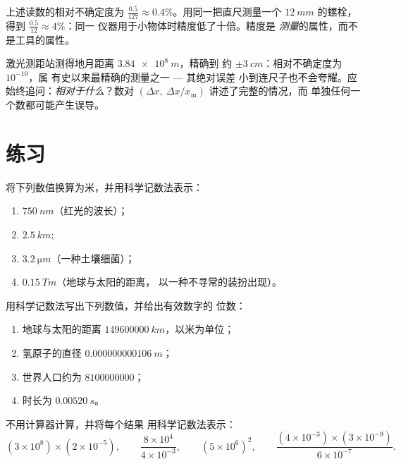 \begin{example}[相对精度]\label{ex:g10:orders-of-magnitude:reading}
上述读数的相对不确定度为
$\frac{0.5}{127} \approx 0.4\%$。用同一把直尺测量一个
$\qty{12}{mm}$ 的螺栓，得到 $\frac{0.5}{12} \approx 4\%$：同一
仪器用于小物体时精度低了十倍。精度是
\emph{测量}的属性，而不是工具的属性。
\end{example}

\begin{remark}\label{rem:g10:orders-of-magnitude:precision}
激光测距站测得地月距离 $\qty{3.84e8}{m}$，精确到
约 $\pm\qty{3}{cm}$：相对不确定度为 $10^{-10}$，属
有史以来最精确的测量之一 --- 其绝对误差
小到连尺子也不会夸耀。应始终追问：\emph{相对于什么}？数对
$(\Delta x,\ \Delta x / x_{\text{m}})$ 讲述了完整的情况，而
单独任何一个数都可能产生误导。
\end{remark}

\section{练习}

\begin{exercise}[$\star$]\label{exo:g10:orders-of-magnitude:1}
将下列数值换算为米，并用科学记数法表示：
\begin{enumerate}
  \item $\qty{750}{nm}$（红光的波长）；
  \item $\qty{2.5}{km}$;
  \item $\qty{3.2}{\micro m}$（一种土壤细菌）；
  \item $\qty{0.15}{Tm}$（地球与太阳的距离，
        以一种不寻常的装扮出现）。
\end{enumerate}
\end{exercise}

\begin{exercise}[$\star$]\label{exo:g10:orders-of-magnitude:2}
用科学记数法写出下列数值，并给出有效数字的
位数：
\begin{enumerate}
  \item 地球与太阳的距离 $\qty{149600000}{km}$，以米为单位；
  \item 氢原子的直径 $\qty{0.000000000106}{m}$；
  \item 世界人口约为 $\num{8100000000}$；
  \item 时长为 $\qty{0.00520}{s}$。
\end{enumerate}
\end{exercise}

\begin{exercise}[$\star$]\label{exo:g10:orders-of-magnitude:3}
不用计算器计算，并将每个结果
用科学记数法表示：
\[
(3\times10^{8})\times(2\times10^{-5}), \qquad
\frac{8\times10^{4}}{4\times10^{-3}}, \qquad
(5\times10^{6})^{2}, \qquad
\frac{(4\times10^{-3})\times(3\times10^{-9})}{6\times10^{-7}} .
\]
\end{exercise}

